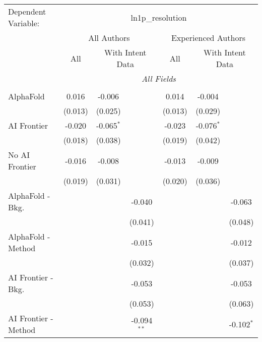\begingroup
\centering
\begin{tabular}{lcccccc}
   \tabularnewline \midrule \midrule
   Dependent Variable: & \multicolumn{6}{c}{ln1p\_resolution}\\
 & \multicolumn{3}{c}{All Authors} & \multicolumn{3}{c}{Experienced Authors} \\
\cmidrule(lr){2-4} \cmidrule(lr){5-7}
 & \multicolumn{1}{c}{All} & \multicolumn{2}{c}{With Intent Data} & \multicolumn{1}{c}{All} & \multicolumn{2}{c}{With Intent Data} \\
\cmidrule(lr){2-2} \cmidrule(lr){3-4} \cmidrule(lr){5-5} \cmidrule(lr){6-7}
 & \multicolumn{6}{c}{\textit{All Fields}} \\ \\
   AlphaFold               & 0.016   & -0.006       &               & 0.014   & -0.004       &   \\   
                           & (0.013) & (0.025)      &               & (0.013) & (0.029)      &   \\   
   AI Frontier             & -0.020  & -0.065$^{*}$ &               & -0.023  & -0.076$^{*}$ &   \\   
                           & (0.018) & (0.038)      &               & (0.019) & (0.042)      &   \\   
   No AI Frontier          & -0.016  & -0.008       &               & -0.013  & -0.009       &   \\   
                           & (0.019) & (0.031)      &               & (0.020) & (0.036)      &   \\   
   AlphaFold - Bkg.        &         &              & -0.040        &         &              & -0.063\\   
                           &         &              & (0.041)       &         &              & (0.048)\\   
   AlphaFold - Method      &         &              & -0.015        &         &              & -0.012\\   
                           &         &              & (0.032)       &         &              & (0.037)\\   
   AI Frontier - Bkg.      &         &              & -0.053        &         &              & -0.053\\   
                           &         &              & (0.053)       &         &              & (0.063)\\   
   AI Frontier - Method    &         &              & -0.094$^{**}$ &         &              & -0.102$^{*}$\\   

\end{tabular}
